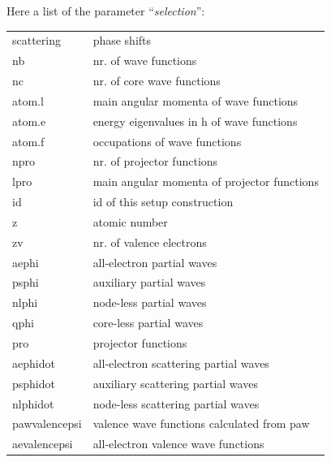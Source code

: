 \documentclass[final,12pt,makeidx,DIV=calc]{article}
\begin{document}
{{{{{{Here a list of the parameter ``\textit{selection}'': 
\begin{center}
\begin{tabular}{ll}
 scattering       & phase shifts                                             \\
 nb               & nr. of wave functions                                    \\
 nc               & nr. of core wave functions                               \\
 atom.l           & main angular momenta of wave functions                   \\
 atom.e           & energy eigenvalues in h of wave functions                \\
 atom.f           & occupations of wave functions                            \\
 npro             & nr. of projector functions                               \\
 lpro             & main angular momenta of projector functions              \\
 id               & id of this setup construction                            \\
 z                & atomic number                                            \\
 zv               & nr. of valence electrons                                 \\
 aephi            & all-electron partial waves                               \\
 psphi            & auxiliary partial waves                                  \\
 nlphi            & node-less partial waves                                  \\
 qphi             & core-less partial waves                                  \\
 pro              & projector functions                                      \\
 aephidot         & all-electron scattering partial waves                    \\
 psphidot         & auxiliary scattering partial waves                       \\
 nlphidot         & node-less scattering partial waves                       \\
 pawvalencepsi    & valence wave functions calculated from paw               \\
 aevalencepsi     & all-electron valence wave functions                      \\

\end{tabular}
\end{center}}}}}}}
\end{document}
